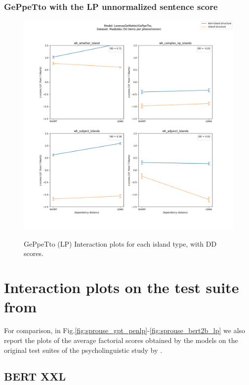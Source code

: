 \subsubsection{GePpeTto with the LP unnormalized sentence score}
\begin{figure}[h]
	\centering
	\includegraphics[width=1\textwidth]{images/AppendixA/Madeddu_wh_LorenzoDeMattei_GePpeTto_LP-zscores-likert-2022-09-14_h15m28s58.png} 
	\label{A-fig:md_gpt_lp}
	\caption{GePpeTto (LP) Interaction plots for each island type, with DD scores.}
\end{figure}


\clearpage
\section{Interaction plots on the test suite from \citet{sprouse2016experimental}}

For comparison, in Fig.\ref{fig:sprouse_gpt_penlp}-\ref{fig:sprouse_bert2b_lp} we also report the plots of the average factorial scores obtained by the models on the original test suites of the psycholinguistic study by \citet{sprouse2016experimental}.


\subsection{BERT XXL}
